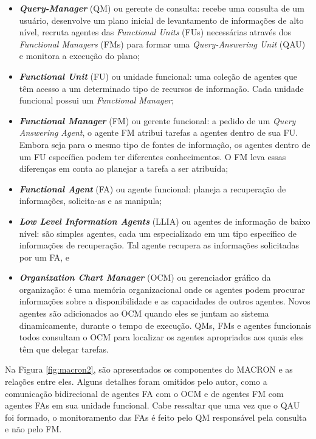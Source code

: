 \begin{description}
\begin{itemize}
    \item \textit{\textbf{Query-Manager}} (QM) ou gerente de consulta: recebe uma consulta de um usuário, desenvolve um plano inicial de levantamento de informações de alto nível, recruta agentes das \textit{Functional Units} (FUs) necessárias através dos \textit{Functional Managers} (FMs) para formar uma \textit{Query-Answering Unit} (QAU) e monitora a execução do plano;
    \item \textit{\textbf{Functional Unit}} (FU) ou unidade funcional: uma coleção de agentes que têm acesso a um determinado tipo de recursos de informação. Cada unidade funcional possui um \textit{Functional Manager};
    \item \textbf{\textit{Functional Manager}} (FM) ou gerente funcional: a pedido de um \textit{Query Answering Agent}, o agente  FM atribui tarefas a agentes dentro de sua FU. Embora seja para o mesmo tipo de fontes de informação, os agentes dentro de um FU específica podem ter diferentes conhecimentos. O FM leva essas diferenças em conta ao planejar a tarefa a ser atribuída;
    \item \textit{\textbf{Functional Agent}} (FA) ou agente funcional: planeja a recuperação de informações, solicita-as e as manipula;
    \item \textit{\textbf{Low Level Information Agents}} (LLIA) ou agentes de informação de baixo nível: são simples agentes, cada um especializado em um tipo específico de informações de recuperação. Tal agente recupera as informações solicitadas por um FA, e
    \item \textit{\textbf{Organization Chart Manager}} (OCM) ou gerenciador gráfico da organização: é uma memória organizacional onde os agentes podem procurar informações sobre a disponibilidade e as capacidades de outros agentes. Novos agentes são adicionados ao OCM quando eles se juntam ao sistema dinamicamente, durante o tempo de execução. QMs, FMs e agentes funcionais todos consultam o OCM para localizar os agentes apropriados aos quais eles têm que delegar tarefas. %
\end{itemize}
    
    Na Figura \ref{fig:macron2}, são apresentados os componentes do MACRON e as relações entre eles. Alguns detalhes foram omitidos pelo autor, como a comunicação bidirecional de agentes FA com o OCM e de agentes FM com agentes FAs em sua unidade funcional. Cabe ressaltar que uma vez que o QAU foi formado, o monitoramento das FAs é feito pelo QM responsável pela consulta e não pelo FM.
    

\end{description}
